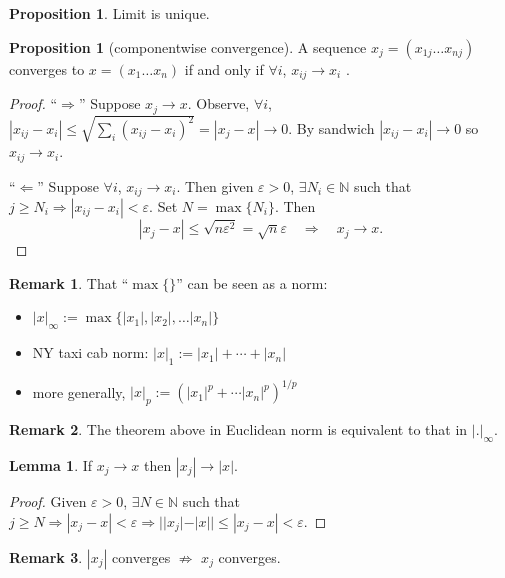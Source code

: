 \documentclass[a4paper]{article}
\theoremstyle{definition}
\newtheorem{prop}[defn]{Proposition}
\newtheorem{lemma}[defn]{Lemma}
\newtheorem*{remark}{Remark}
\begin{document}
\begin{prop}
	Limit is unique.
\end{prop}

\begin{prop}
	[componentwise convergence] A sequence $x_j=(x_{1j} \ldots x_{nj})$ converges to $x=(x_1 \ldots x_n)$ if and only if $\forall i$, $x_{ij} \rightarrow x_i$ .
\end{prop}
\begin{proof}
	``$\Rightarrow$'' Suppose $x_j \rightarrow x$. Observe, $\forall i$, $|x_{ij}-x_i| \leq \sqrt{\sum_i (x_{ij}-x_i)^2}=|x_j-x| \rightarrow 0$. By sandwich $|x_{ij}-x_i| \rightarrow 0$ so $x_{ij} \rightarrow x_i$.

	``$\Leftarrow$'' Suppose $\forall i$, $x_{ij}\rightarrow x_i$. Then given $\varepsilon > 0$, $\exists N_i \in \mathbb N$ such that $j \geq N_i \Rightarrow |x_{ij}-x_i|<\varepsilon$. Set $N=\max \{N_i\}$. Then
\[
|x_j-x| \leq \sqrt{n\varepsilon^2}=\sqrt n \varepsilon \quad \Rightarrow \quad x_j \rightarrow x .
\]
\end{proof}
\begin{remark}
	That ``$\max \{\}$'' can be seen as a norm:
	\begin{itemize}
		\item $|x|_{\infty} := \max \{ |x_1|,|x_2|,\ldots |x_n| \}$
		\item NY taxi cab norm: $|x|_1 := |x_1|+\cdots +|x_n|$
		\item more generally, $|x|_p := \left( |x_1|^p + \cdots |x_n|^p \right)^{1/p}$ 
	\end{itemize}
\end{remark}
\begin{remark}
	The theorem above in Euclidean norm is equivalent to that in $|.|_{\infty}$.
\end{remark}

\begin{lemma}
	If $x_j \rightarrow x$ then $|x_j| \rightarrow |x|$.
\end{lemma}
\begin{proof}
	Given $\varepsilon >0$, $\exists N \in \mathbb N$ such that $j \geq N \Rightarrow |x_j-x|<\varepsilon \Rightarrow ||x_j|-|x|| \leq |x_j-x| < \varepsilon$.
\end{proof}
\begin{remark}
	$|x_j|$ converges $\not\Rightarrow$ $x_j$ converges.
\end{remark}
\end{document}
